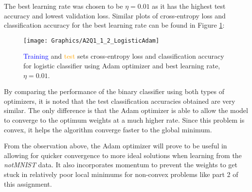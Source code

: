 \documentclass[a4paper,12pt]{article}
\begin{document}

The best learning rate was chosen to be $\eta = 0.01$ as it has the highest test accuracy and lowest validation loss. Similar plots of cross-entropy loss and classification accuracy for the best learning rate can be found in Figure \ref{figure:LogisticAdam}:

\begin{figure}[!htb]
\centering
\texttt{[image: Graphics/A2Q1\_1\_2\_LogisticAdam]}
\caption{\label{figure:LogisticAdam} \textcolor{blue}{Training} and \textcolor{orange}{test} sets cross-entropy loss and classification accuracy for logistic classifier using Adam optimizer and best learning rate, $\eta = 0.01$.}
\end{figure}

By comparing the performance of the binary classifier using both types of optimizers, it is noted that the test classification accuracies obtained are very similar. The only difference is that the Adam optimizer is able to allow the model to converge to the optimum weights at a much higher rate. Since this problem is convex, it helps the algorithm converge faster to the global minimum. 

From the observation above, the Adam optimizer will prove to be useful in allowing for quicker convergence to more ideal solutions when learning from the \textit{notMNIST} data. It also incorporates momentum to prevent the weights to get stuck in relatively poor local minimums for non-convex problems like part 2 of this assignment. 
\end{document}

